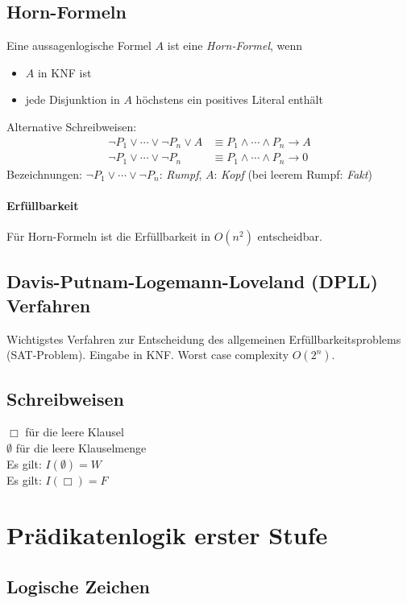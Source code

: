 \documentclass{article}
\begin{document}
\subsection{Horn-Formeln}
Eine aussagenlogische Formel $A$ ist eine \textit{Horn-Formel}, wenn
\begin{itemize}
    \item $A$ in KNF ist
    \item jede Disjunktion in $A$ h\"ochstens ein positives Literal enth\"alt
\end{itemize}
Alternative Schreibweisen:
\begin{align*}
    \lnot P_1 \lor \cdots \lor \lnot P_n \lor A &\equiv
P_1 \land \cdots \land P_n \rightarrow A \\
    \lnot P_1 \lor \cdots \lor \lnot P_n &\equiv
P_1 \land \cdots \land P_n \rightarrow 0
\end{align*}
Bezeichnungen: $\lnot P_1 \lor \cdots \lor \lnot P_n$: \textit{Rumpf},
\qquad $A$: \textit{Kopf} (bei leerem Rumpf: \textit{Fakt})

\paragraph{Erf\"ullbarkeit} 
F\"ur Horn-Formeln ist die Erf\"ullbarkeit in 
$O(n^2)$ entscheidbar.

\subsection{Davis-Putnam-Logemann-Loveland (DPLL) Verfahren}
Wichtigstes Verfahren zur Entscheidung des allgemeinen Erf\"ullbarkeitsproblems (SAT-Problem). Eingabe in KNF. Worst case complexity $O(2^n)$.


\subsection{Schreibweisen}
$\Box$ f\"ur die leere Klausel \\
$\emptyset$ f\"ur die leere Klauselmenge \\
Es gilt: $I(\emptyset) = W$ \\
Es gilt: $I(\Box) = F$ \\

\section{Pr\"adikatenlogik erster Stufe}
\subsection{Logische Zeichen}
\end{document}
